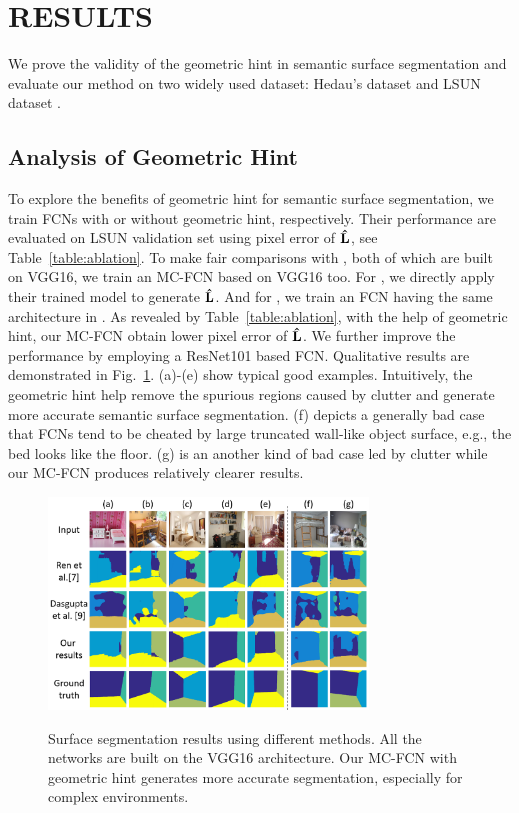 \section{RESULTS}
\label{sec:Res}

We prove the validity of the geometric hint in semantic surface segmentation and evaluate our method on two widely used dataset: Hedau's dataset \cite{hedau2009recovering} and LSUN dataset \cite{zhang2015large}. 

\subsection{Analysis of Geometric Hint}
\label{sec:ablation}
To explore the benefits of geometric hint for semantic surface segmentation, we train FCNs with or without geometric hint, respectively. Their performance are evaluated on LSUN validation set using pixel error of $\mathbf{\hat{L}}$, see Table~\ref{table:ablation}. To make fair comparisons with \cite{ren2016coarse, dasgupta2016delay}, both of which are built on VGG16, we train an MC-FCN based on VGG16 too. For \cite{ren2016coarse}, we directly apply their trained model to generate $\mathbf{\hat{L}}$. And for \cite{dasgupta2016delay}, we train an FCN having the same architecture in \cite{dasgupta2016delay}. As revealed by Table~\ref{table:ablation}, with the help of geometric hint, our MC-FCN obtain lower pixel error of $\mathbf{\hat{L}}$. We further improve the performance by employing a ResNet101 \cite{he2016deep} based FCN. Qualitative results are demonstrated in Fig.~\ref{fig:fcn-comparison}. (a)-(e) show typical good examples. Intuitively, the geometric hint help remove the spurious regions caused by clutter and generate more accurate semantic surface segmentation. (f) depicts a generally bad case that FCNs tend to be cheated by large truncated wall-like object surface, e.g., the bed looks like the floor. (g) is an another kind of bad case led by clutter while our MC-FCN produces relatively clearer results.  

\begin{figure}[!ht]
	\centering 
	\textsc{\includegraphics[width=8.5cm]{figure/compare1.png}}
	\caption{Surface segmentation results using different methods. All the networks are built on the VGG16 architecture. Our MC-FCN with geometric hint generates more accurate segmentation, especially  for complex environments.}
	\label{fig:fcn-comparison}
\end{figure}

